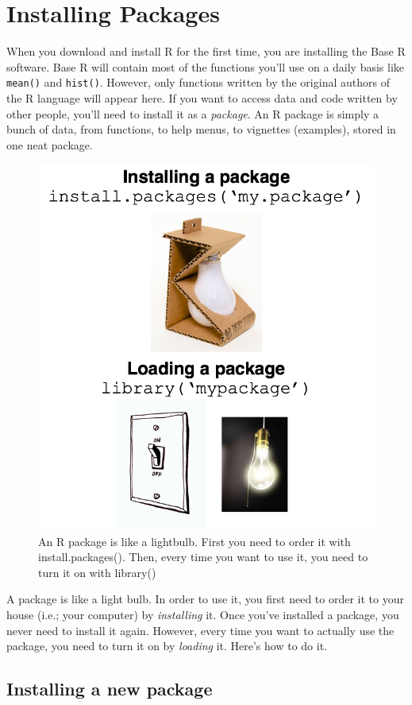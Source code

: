 \documentclass[
]{book}
\begin{document}
\hypertarget{NAVIGATE-INSTALL-PACKAGE}{%
\section{Installing Packages}\label{NAVIGATE-INSTALL-PACKAGE}}

When you download and install R for the first time, you are installing the Base R software. Base R will contain most of the functions you'll use on a daily basis like \texttt{mean()} and \texttt{hist()}. However, only functions written by the original authors of the R language will appear here. If you want to access data and code written by other people, you'll need to install it as a \emph{package}. An R package is simply a bunch of data, from functions, to help menus, to vignettes (examples), stored in one neat package.

\begin{figure}

{\centering \includegraphics[width=0.5\linewidth]{images/chapter-3/packagebulb} 

}

\caption{An R package is like a lightbulb. First you need to order it with install.packages(). Then, every time you want to use it, you need to turn it on with library()}\label{fig:package}
\end{figure}

A package is like a light bulb. In order to use it, you first need to order it to your house (i.e.; your computer) by \emph{installing} it. Once you've installed a package, you never need to install it again. However, every time you want to actually use the package, you need to turn it on by \emph{loading} it. Here's how to do it.

\hypertarget{installing-a-new-package}{%
\subsection{Installing a new package}\label{installing-a-new-package}}
\end{document}
